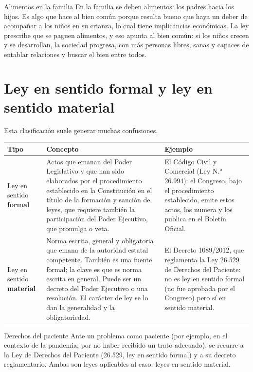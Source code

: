 \documentclass[12pt,oneside]{book}
\begin{document}
\begin{example}{Alimentos en la familia}
En la familia se deben alimentos: los padres hacia los hijos. Es algo que hace al bien común porque resulta bueno que haya un deber de acompañar a los niños en su crianza, lo cual tiene implicancias económicas. La ley prescribe que se paguen alimentos, y eso apunta al bien común: si los niños crecen y se desarrollan, la sociedad progresa, con más personas libres, sanas y capaces de entablar relaciones y buscar el bien entre todos.
\end{example}

\section{Ley en sentido formal y ley en sentido material}

Esta clasificación suele generar muchas confusiones.

\begin{table}[H]
\centering
\begin{tabularx}{\textwidth}{>{\raggedright\arraybackslash}p{} >{\raggedright\arraybackslash}X >{\raggedright\arraybackslash}p{}}
\toprule
\textbf{Tipo} & \textbf{Concepto} & \textbf{Ejemplo} \\
\midrule
Ley en sentido \textbf{formal} &
Actos que emanan del Poder Legislativo y que han sido elaborados por el procedimiento establecido en la Constitución en el título de la formación y sanción de leyes, que requiere también la participación del Poder Ejecutivo, que promulga o veta. &
El Código Civil y Comercial (Ley N.° 26.994): el Congreso, bajo el procedimiento establecido, emite estos actos, los numera y los publica en el Boletín Oficial. \\
\addlinespace
Ley en sentido \textbf{material} &
Norma escrita, general y obligatoria que emana de la autoridad estatal competente. También es una fuente formal; la clave es que es norma escrita en general. Puede ser un decreto del Poder Ejecutivo o una resolución. El carácter de ley se lo dan la generalidad y la obligatoriedad. &
El Decreto 1089/2012, que reglamenta la Ley 26.529 de Derechos del Paciente: no es ley en sentido formal (no fue aprobada por el Congreso) pero sí en sentido material. \\
\bottomrule
\end{tabularx}
\end{table}

\begin{example}{Derechos del paciente}
Ante un problema como paciente (por ejemplo, en el contexto de la pandemia, por no haber recibido un trato adecuado), se recurre a la Ley de Derechos del Paciente (26.529, ley en sentido formal) y a su decreto reglamentario. Ambas son leyes aplicables al caso: leyes en sentido material.
\end{example}
\end{document}
